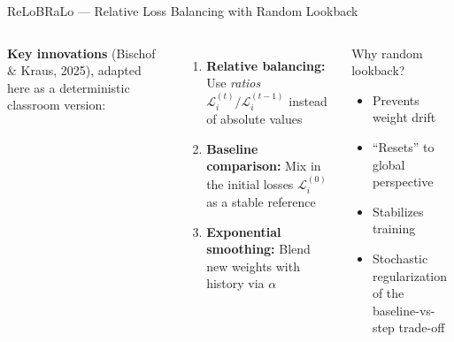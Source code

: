 \documentclass[aspectratio=169,11pt]{beamer}
\newcommand{\emphc}[1]{\textcolor{harvardcrimson}{#1}}
\begin{document}
\begin{frame}{ReLoBRaLo --- Relative Loss Balancing with Random Lookback}
\begin{columns}[T]
\textbf{Key innovations} (Bischof \& Kraus, 2025), adapted here as a deterministic classroom version:

\vspace{0.2cm}
\begin{enumerate}
    \item \textbf{Relative balancing:} Use \emph{ratios} $\mathcal{L}_i^{(t)} / \mathcal{L}_i^{(t-1)}$ instead of absolute values

    \vspace{0.2cm}
    \item \textbf{Baseline comparison:} Mix in the \emphc{initial losses} $\mathcal{L}_i^{(0)}$ as a stable reference

    \vspace{0.2cm}
    \item \textbf{Exponential smoothing:} Blend new weights with history via $\alpha$
\end{enumerate}

\begin{block}{Why random lookback?}
\begin{itemize}
    \item Prevents weight drift
    \item ``Resets'' to global perspective
    \item Stabilizes training
    \item Stochastic regularization of the baseline-vs-step trade-off
\end{itemize}
\end{block}
\end{columns}
\end{frame}
\end{document}
